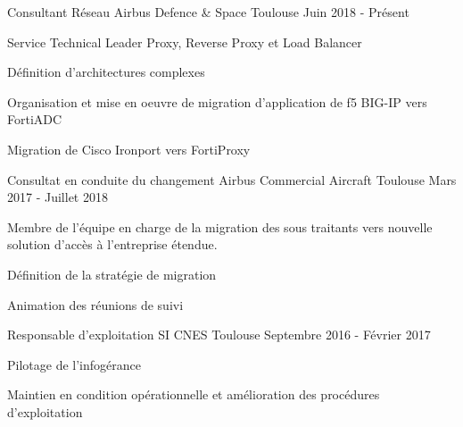 

\begin{cventries}

  \cventry
    {Consultant Réseau} %
    {Airbus Defence \& Space} %
    {Toulouse} %
    {Juin 2018 - Présent} %
    {
      \begin{cvitems} %
        \item {Service Technical Leader Proxy, Reverse Proxy et Load Balancer}
        \item {Définition d'architectures complexes}
        \item {Organisation et mise en oeuvre de migration d'application de f5 BIG-IP vers FortiADC}
        \item {Migration de Cisco Ironport vers FortiProxy}
      \end{cvitems}
    }

  \cventry
    {Consultat en conduite du changement} %
    {Airbus Commercial Aircraft} %
    {Toulouse} %
    {Mars 2017 - Juillet 2018} %
    {
      \begin{cvdoubleitems} %
        \item {Membre de l'équipe en charge de la migration des sous traitants vers nouvelle solution d'accès à l'entreprise étendue.}
        \item {Définition de la stratégie de migration}
        \item {Animation des réunions de suivi}
      \end{cvdoubleitems}
    }

  \cventry
    {Responsable d'exploitation SI} %
    {CNES} %
    {Toulouse} %
    {Septembre 2016 - Février 2017} %
    {
      \begin{cvitems} %
        \item {Pilotage de l'infogérance}
        \item {Maintien en condition opérationnelle et amélioration des procédures d'exploitation}
      \end{cvitems}
    }
    

\end{cventries}
